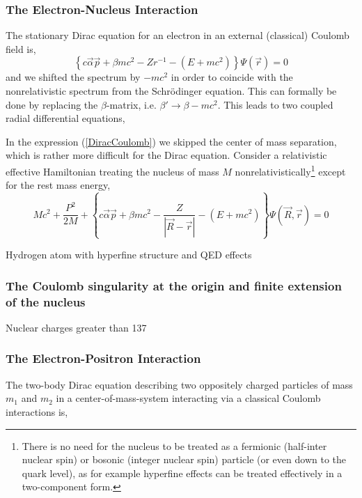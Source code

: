 \documentclass[12pt]{article}
\begin{document}
\subsubsection{\sffamily The Electron-Nucleus Interaction}
The stationary Dirac equation for an electron in an external (classical) Coulomb field is,
\begin{equation}
   \left\{ c \vec{\alpha} \vec{p} + \beta mc^2 - Zr^{-1} - \left( E + mc^2\right)\right\} \Psi (\vec{r}) = 0
   \label{DiracCoulomb}
\end{equation}
and we shifted the spectrum by $-mc^2$ in order to coincide with the nonrelativistic spectrum from the Schr\"odinger equation. This can formally be done by replacing the $\beta$-matrix, i.e. $\beta'\rightarrow\beta-mc^2$. This leads to two coupled radial differential equations,


In the expression (\ref{DiracCoulomb}) we skipped the center of mass separation, which is rather more difficult for the Dirac equation.\cite{Bechert-Meixner-1935,Breit-1948,Barker-Glover-1955,sapirstein-Yennie-1990} Consider a relativistic effective Hamiltonian treating the nucleus of mass $M$ nonrelativistically\footnote{There is no need for the nucleus to be treated as a fermionic (half-inter nuclear spin) or bosonic (integer nuclear spin) particle (or even down to the quark level), as for example hyperfine effects can be treated effectively in a two-component form.} except for the rest mass energy,
\begin{equation}
   Mc^2 + \frac{P^2}{2M} + \left\{ c \vec{\alpha} \vec{p} + \beta mc^2 - \frac{Z}{|\vec{R}-\vec{r}|} - \left( E + mc^2\right)\right\} \Psi (\vec{R},\vec{r}) = 0
   \label{DiracCoulomb}
\end{equation}



Hydrogen atom with hyperfine structure and QED effects

\subsubsection{\sffamily The Coulomb singularity at the origin and finite extension of the nucleus}
Nuclear charges greater than 137

\subsubsection{\sffamily The Electron-Positron Interaction}
The two-body Dirac equation describing two oppositely charged particles of mass $m_1$ and $m_2$ in a center-of-mass-system interacting via a classical Coulomb interactions is,
\end{document}
